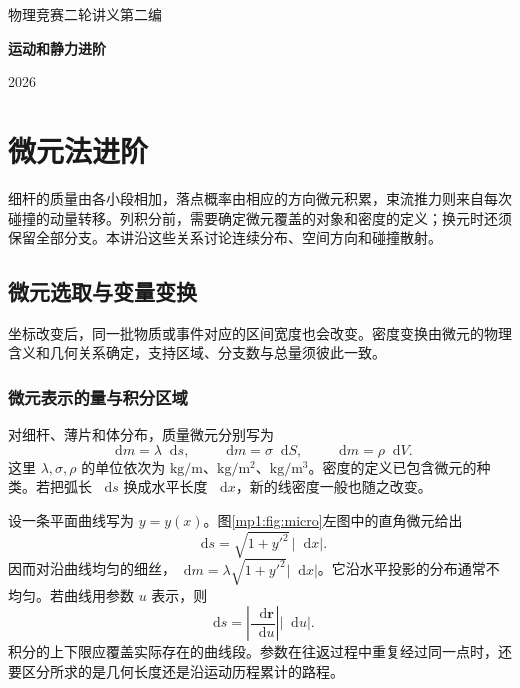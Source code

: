 \documentclass[11pt,openany,fontset=fandol]{ctexbook}
\theoremstyle{definition}\newtheorem{example}{例}[chapter]\newtheorem{exercise}{习题}[chapter]
\newcommand{\dd}{\mathop{}\!\mathrm d}\newcommand{\ee}{\mathrm e}\newcommand{\vct}[1]{\bm{#1}}
\begin{document}
\frontmatter
\begin{titlepage}
\centering\vspace*{30mm}
{\Large 物理竞赛二轮讲义\quad 第二编\par}\vspace{8mm}

{\Huge\bfseries 运动和静力进阶\par}
\vspace{12mm}{\Large 物理竞赛二轮讲义\par}
\vspace{10mm}{\large 第一讲至第五讲\par}
\vfill{\large 2026\par}
\end{titlepage}
\begingroup\small\setlength{\parskip}{0pt}\linespread{1}\selectfont\tableofcontents\endgroup\mainmatter
\setcounter{chapter}{0}


\chapter{微元法进阶}

细杆的质量由各小段相加，落点概率由相应的方向微元积累，束流推力则来自每次碰撞的动量转移。列积分前，需要确定微元覆盖的对象和密度的定义；换元时还须保留全部分支。本讲沿这些关系讨论连续分布、空间方向和碰撞散射。


\section{微元选取与变量变换}
坐标改变后，同一批物质或事件对应的区间宽度也会改变。密度变换由微元的物理含义和几何关系确定，支持区域、分支数与总量须彼此一致。

\subsection{微元表示的量与积分区域}
对细杆、薄片和体分布，质量微元分别写为
\[
\dd m=\lambda\dd s,\qquad \dd m=\sigma\dd S,\qquad \dd m=\rho\dd V.
\]
这里 $\lambda,\sigma,\rho$ 的单位依次为 $\mathrm{kg/m}$、$\mathrm{kg/m^2}$、$\mathrm{kg/m^3}$。密度的定义已包含微元的种类。若把弧长 $\dd s$ 换成水平长度 $\dd x$，新的线密度一般也随之改变。

设一条平面曲线写为 $y=y(x)$。图\ref{mp1:fig:micro}左图中的直角微元给出
\[
\dd s=\sqrt{1+y'^2}\,|\dd x|.
\]
因而对沿曲线均匀的细丝，$\dd m=\lambda\sqrt{1+y'^2}|\dd x|$。它沿水平投影的分布通常不均匀。若曲线用参数 $u$ 表示，则
\[
\dd s=\left|\frac{\dd\vct r}{\dd u}\right||\dd u|.
\]
积分的上下限应覆盖实际存在的曲线段。参数在往返过程中重复经过同一点时，还要区分所求的是几何长度还是沿运动历程累计的路程。
\end{document}
